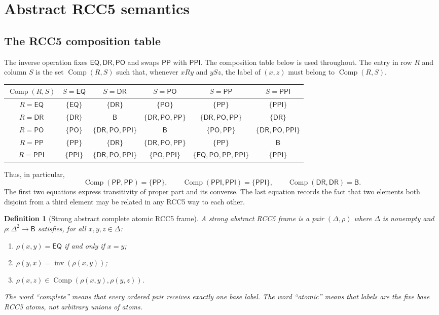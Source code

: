\documentclass[11pt]{article}
\newtheorem{definition}[theorem]{Definition}
\newcommand{\Base}{\mathsf B}
\newcommand{\EQ}{\mathsf{EQ}}
\newcommand{\DR}{\mathsf{DR}}
\newcommand{\PO}{\mathsf{PO}}
\newcommand{\PP}{\mathsf{PP}}
\newcommand{\PPI}{\mathsf{PPI}}
\newcommand{\Inv}{\operatorname{inv}}
\newcommand{\comp}{\operatorname{Comp}}
\begin{document}
\section{Abstract RCC5 semantics}

\subsection{The RCC5 composition table}

The inverse operation fixes $\EQ,\DR,\PO$ and swaps $\PP$ with $\PPI$.  The composition table below is used throughout.  The entry in row $R$ and column $S$ is the set $\comp(R,S)$ such that, whenever $xRy$ and $ySz$, the label of $(x,z)$ must belong to $\comp(R,S)$.

\begin{center}
\renewcommand{\arraystretch}{1.18}
\begin{tabular}{c|ccccc}
\toprule
$\comp(R,S)$ & $S=\EQ$ & $S=\DR$ & $S=\PO$ & $S=\PP$ & $S=\PPI$ \\
\midrule
$R=\EQ$  & $\{\EQ\}$ & $\{\DR\}$ & $\{\PO\}$ & $\{\PP\}$ & $\{\PPI\}$ \\
$R=\DR$  & $\{\DR\}$ & $\Base$ & $\{\DR,\PO,\PP\}$ & $\{\DR,\PO,\PP\}$ & $\{\DR\}$ \\
$R=\PO$  & $\{\PO\}$ & $\{\DR,\PO,\PPI\}$ & $\Base$ & $\{\PO,\PP\}$ & $\{\DR,\PO,\PPI\}$ \\
$R=\PP$  & $\{\PP\}$ & $\{\DR\}$ & $\{\DR,\PO,\PP\}$ & $\{\PP\}$ & $\Base$ \\
$R=\PPI$ & $\{\PPI\}$ & $\{\DR,\PO,\PPI\}$ & $\{\PO,\PPI\}$ & $\{\EQ,\PO,\PP,\PPI\}$ & $\{\PPI\}$ \\
\bottomrule
\end{tabular}
\end{center}

Thus, in particular,
\[
  \comp(\PP,\PP)=\{\PP\},\qquad
  \comp(\PPI,\PPI)=\{\PPI\},\qquad
  \comp(\DR,\DR)=\Base.
\]
The first two equations express transitivity of proper part and its converse.  The last equation records the fact that two elements both disjoint from a third element may be related in any RCC5 way to each other.

\begin{definition}[Strong abstract complete atomic RCC5 frame]\label{def:frame}
A strong abstract RCC5 frame is a pair $(\Delta,\rho)$ where $\Delta$ is nonempty and $\rho:\Delta^2\to\Base$ satisfies, for all $x,y,z\in\Delta$:
\begin{enumerate}[label=(F\arabic*)]
\item $\rho(x,y)=\EQ$ if and only if $x=y$;
\item $\rho(y,x)=\Inv(\rho(x,y))$;
\item $\rho(x,z)\in\comp(\rho(x,y),\rho(y,z))$.
\end{enumerate}
The word ``complete'' means that every ordered pair receives exactly one base label.  The word ``atomic'' means that labels are the five base RCC5 atoms, not arbitrary unions of atoms.
\end{definition}
\end{document}
